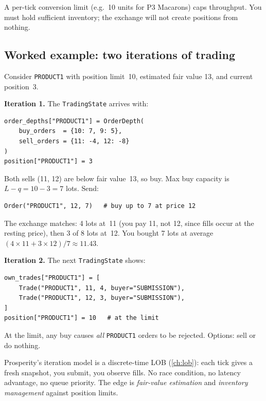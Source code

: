 A per-tick conversion limit (e.g.\ 10 units for P3 Macarons) caps
throughput.  You must hold sufficient inventory; the exchange will not
create positions from nothing.

\subsection{Worked example: two iterations of trading}
\label{sec:worked_iterations}

Consider \texttt{PRODUCT1} with position limit~10, estimated fair value
13, and current position~3.

\textbf{Iteration 1.}  The \texttt{TradingState} arrives with:
\begin{lstlisting}[numbers=none, frame=none,
  backgroundcolor=\color{codebg}]
order_depths["PRODUCT1"] = OrderDepth(
    buy_orders  = {10: 7, 9: 5},
    sell_orders = {11: -4, 12: -8}
)
position["PRODUCT1"] = 3
\end{lstlisting}

Both sells (11, 12) are below fair value~13, so buy.  Max buy capacity
is $L - q = 10 - 3 = 7$ lots.  Send:
\begin{lstlisting}[numbers=none, frame=none,
  backgroundcolor=\color{codebg}]
Order("PRODUCT1", 12, 7)   # buy up to 7 at price 12
\end{lstlisting}

The exchange matches: 4 lots at~11 (you pay 11, not 12, since fills
occur at the resting price), then 3 of 8 lots at~12.  You bought 7 lots at average
$(4 \times 11 + 3 \times 12)/7 \approx 11.43$.

\textbf{Iteration 2.}  The next \texttt{TradingState} shows:
\begin{lstlisting}[numbers=none, frame=none,
  backgroundcolor=\color{codebg}]
own_trades["PRODUCT1"] = [
    Trade("PRODUCT1", 11, 4, buyer="SUBMISSION"),
    Trade("PRODUCT1", 12, 3, buyer="SUBMISSION"),
]
position["PRODUCT1"] = 10   # at the limit
\end{lstlisting}

At the limit, any buy causes \emph{all} \texttt{PRODUCT1} orders to be
rejected.  Options: sell or do nothing.

\begin{intuitionbox}
Prosperity's iteration model is a discrete-time LOB (\cref{ch:lob}):
each tick gives a fresh snapshot, you submit, you observe fills.  No
race condition, no latency advantage, no queue priority.  The edge is
\emph{fair-value estimation} and \emph{inventory management} against
position limits.
\end{intuitionbox}

